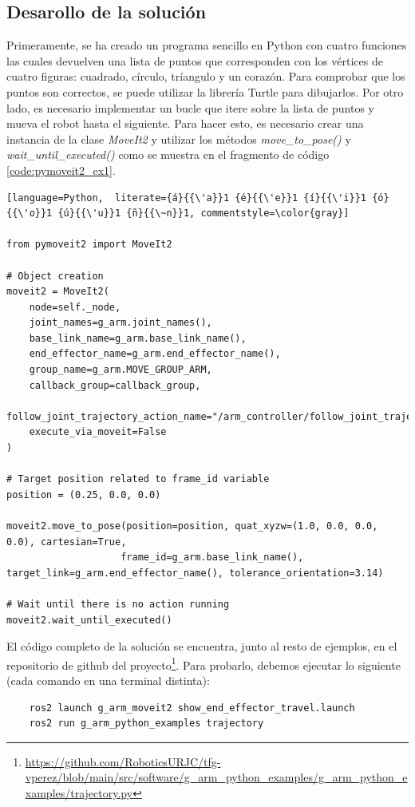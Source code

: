 \subsection*{Desarollo de la solución}
\noindent Primeramente, se ha creado un programa sencillo en Python con cuatro funciones las cuales devuelven una lista de puntos que corresponden 
con los vértices de cuatro figuras: cuadrado, círculo, tríangulo y un corazón. Para comprobar que los puntos son correctos, se puede utilizar la librería 
Turtle para dibujarlos. Por otro lado, es necesario implementar un bucle que itere sobre la lista de puntos y mueva el robot hasta el siguiente. Para hacer 
esto, es necesario crear una instancia de la clase \textit{MoveIt2} y utilizar los métodos \textit{move\_to\_pose()} y \textit{wait\_until\_executed()} 
como se muestra en el fragmento de código \ref{code:pymoveit2_ex1}.
\begin{code}[ht!]
\begin{lstlisting}[language=Python,  literate={á}{{\'a}}1 {é}{{\'e}}1 {í}{{\'i}}1 {ó}{{\'o}}1 {ú}{{\'u}}1 {ñ}{{\~n}}1, commentstyle=\color{gray}]
    
from pymoveit2 import MoveIt2

# Object creation
moveit2 = MoveIt2(
    node=self._node,
    joint_names=g_arm.joint_names(),
    base_link_name=g_arm.base_link_name(),
    end_effector_name=g_arm.end_effector_name(),
    group_name=g_arm.MOVE_GROUP_ARM,
    callback_group=callback_group,
    follow_joint_trajectory_action_name="/arm_controller/follow_joint_trajectory",
    execute_via_moveit=False
)

# Target position related to frame_id variable
position = (0.25, 0.0, 0.0) 

moveit2.move_to_pose(position=position, quat_xyzw=(1.0, 0.0, 0.0, 0.0), cartesian=True, 
                    frame_id=g_arm.base_link_name(), target_link=g_arm.end_effector_name(), tolerance_orientation=3.14)

# Wait until there is no action running                  
moveit2.wait_until_executed()

\end{lstlisting}
\caption{Uso básico de PyMoveIt2 para moverse a un punto}
\label{code:pymoveit2_ex1}
\end{code}

\newpage
El código completo de la solución se encuentra, junto al resto de ejemplos, en el repositorio de github del 
proyecto\footnote{\url{https://github.com/RoboticsURJC/tfg-vperez/blob/main/src/software/g\_arm\_python_examples/g\_arm_python\_examples/trajectory.py}}. Para 
probarlo, debemos ejecutar lo siguiente (cada comando en una terminal distinta):
\begin{verbatim}
    ros2 launch g_arm_moveit2 show_end_effector_travel.launch 
    ros2 run g_arm_python_examples trajectory
\end{verbatim}

